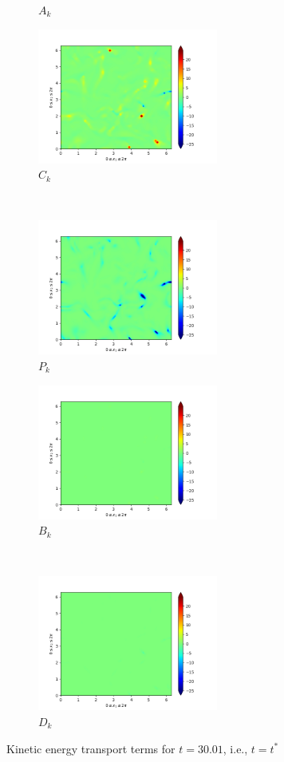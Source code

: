 \begin{figure}[H]
\begin{subfigure}{0.45\textwidth}
        \caption{$A_{k}$}
    \end{subfigure}
    \newline
    \begin{subfigure}{0.45\textwidth}
        \includegraphics[height=1.75in]{media/run-cds-65/C-ke-1340.png}
        \caption{$C_{k}$}
    \end{subfigure}
    ~
    \begin{subfigure}{0.45\textwidth}
        \includegraphics[height=1.75in]{media/run-cds-65/P-ke-1340.png}
        \caption{$P_{k}$}
    \end{subfigure}
    \newline
    \begin{subfigure}{0.45\textwidth}
        \includegraphics[height=1.75in]{media/run-cds-65/B-ke-1340.png}
        \caption{$B_{k}$}
    \end{subfigure}
    ~
    \begin{subfigure}{0.45\textwidth}
        \includegraphics[height=1.75in]{media/run-cds-65/D-ke-1340.png}
        \caption{$D_{k}$}
    \end{subfigure}
    \caption{Kinetic energy transport terms for $t=30.01$, i.e., $t=t^{\ast} $}
\end{figure}
